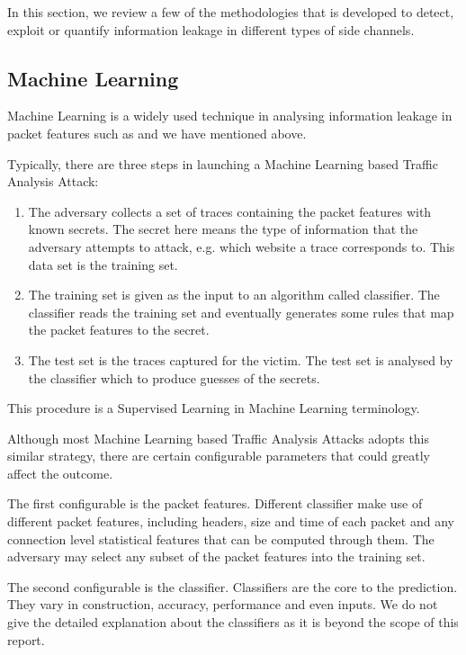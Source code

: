In this section, we review a few of the methodologies that is developed to detect, exploit or quantify information leakage in different types of side channels. 

\subsection{Machine Learning}
Machine Learning is a widely used technique in analysing information leakage in packet features such as \cite{Peekaboo} \cite{TrafficMorphing} \cite{WebsiteFingerprint} \cite{HClassifier} \cite{PClassifier} and \cite{HTTPOS} we have mentioned above. 

Typically, there are three steps in launching a Machine Learning based Traffic Analysis Attack:

\begin{enumerate}
	\item The adversary collects a set of traces containing the packet features with known secrets. The secret here means the type of information that the adversary attempts to attack, e.g. which website a trace corresponds to. This data set is the training set.
	\item The training set is given as the input to an algorithm called classifier. The classifier reads the training set and eventually generates some rules that map the packet features to the secret. 
	\item The test set is the traces captured for the victim. The test set is analysed by the classifier which to produce guesses of the secrets.
\end{enumerate}

This procedure is a Supervised Learning in Machine Learning terminology.

Although most Machine Learning based Traffic Analysis Attacks adopts this similar strategy, there are certain configurable parameters that could greatly affect the outcome.

The first configurable is the packet features. Different classifier make use of different packet features, including headers, size and time of each packet and any connection level statistical features that can be computed through them. The adversary may select any subset of the packet features into the training set.

The second configurable is the classifier. Classifiers are the core to the prediction. They vary in construction,  accuracy, performance and even inputs. We do not give the detailed explanation about the classifiers as it is beyond the scope of this report. 


